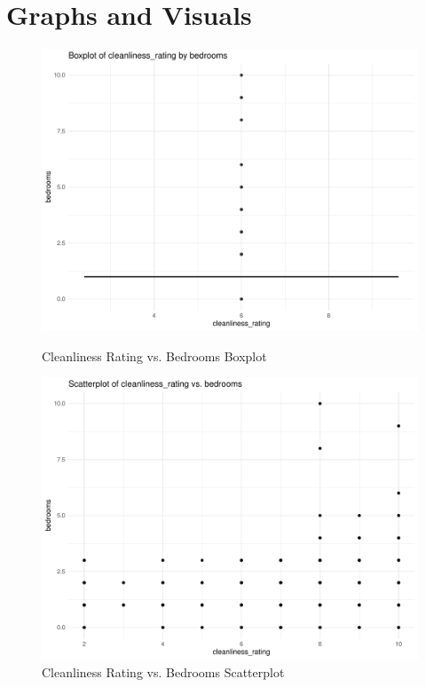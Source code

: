 \documentclass[12pt, letterpaper]{article}
\begin{document}
\newpage

\section*{Graphs and Visuals}

\begin{figure}[H]
  \begin{minipage}{0.45\textwidth}
    \includegraphics[width=\linewidth]{cleanliness_rating_bedrooms__boxplot.pdf}
    \caption{Cleanliness Rating vs. Bedrooms Boxplot}
    \label{fig:cleanliness_rating_bedrooms__boxplot}
  \end{minipage}
  \hspace{0.05\textwidth}
  \begin{minipage}{0.45\textwidth}
    \includegraphics[width=\linewidth]{cleanliness_rating_bedrooms__scatterplot.pdf}
    \caption{Cleanliness Rating vs. Bedrooms Scatterplot}
    \label{fig:cleanliness_rating_bedrooms__scatterplot}
  \end{minipage}


\end{figure}
\end{document}
